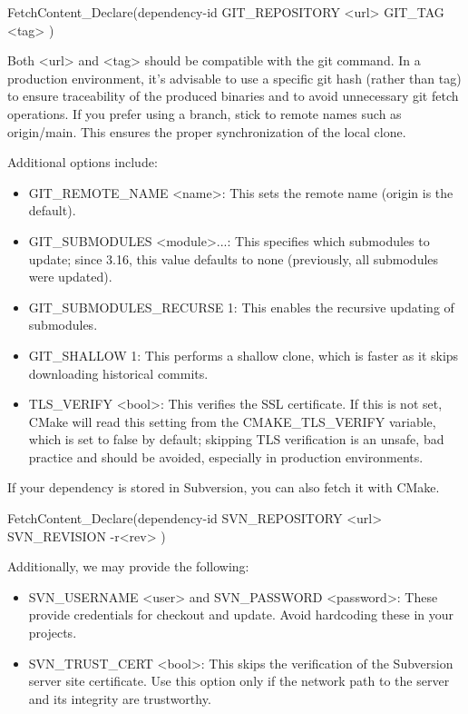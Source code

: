 \begin{shell}
FetchContent_Declare(dependency-id
                     GIT_REPOSITORY <url>
                     GIT_TAG <tag>
)
\end{shell}

Both <url> and <tag> should be compatible with the git command. In a production environment, it’s advisable to use a specific git hash (rather than tag) to ensure traceability of the produced binaries and to avoid unnecessary git fetch operations. If you prefer using a branch, stick to remote names such as origin/main. This ensures the proper synchronization of the local clone.

Additional options include:

\begin{itemize}
\item
GIT\_REMOTE\_NAME <name>: This sets the remote name (origin is the default).

\item
GIT\_SUBMODULES <module>...: This specifies which submodules to update; since 3.16, this value defaults to none (previously, all submodules were updated).

\item
GIT\_SUBMODULES\_RECURSE 1: This enables the recursive updating of submodules.

\item
GIT\_SHALLOW 1: This performs a shallow clone, which is faster as it skips downloading historical commits.

\item
TLS\_VERIFY <bool>: This verifies the SSL certificate. If this is not set, CMake will read this setting from the CMAKE\_TLS\_VERIFY variable, which is set to false by default; skipping TLS verification is an unsafe, bad practice and should be avoided, especially in production environments.
\end{itemize}

If your dependency is stored in Subversion, you can also fetch it with CMake.


\begin{shell}
FetchContent_Declare(dependency-id
                     SVN_REPOSITORY <url>
                     SVN_REVISION -r<rev>
)
\end{shell}

Additionally, we may provide the following:

\begin{itemize}
\item
SVN\_USERNAME <user> and SVN\_PASSWORD <password>: These provide credentials for checkout and update. Avoid hardcoding these in your projects.

\item
SVN\_TRUST\_CERT <bool>: This skips the verification of the Subversion server site certificate. Use this option only if the network path to the server and its integrity are trustworthy.
\end{itemize}

